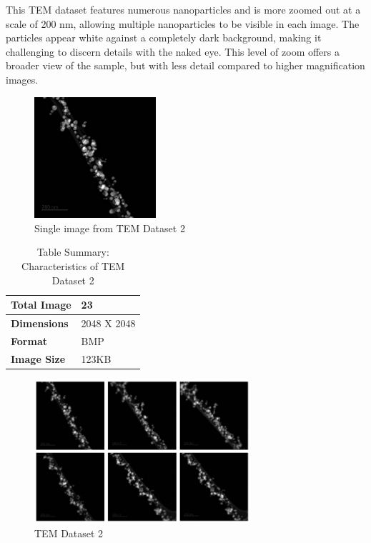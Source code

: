 \begin{itemize}
        This TEM dataset features numerous nanoparticles and is more zoomed out at a scale of 200 nm, allowing multiple nanoparticles to be visible in each image. The particles appear white against a completely dark background, making it challenging to discern details with the naked eye. This level of zoom offers a broader view of the sample, but with less detail compared to higher magnification images. 

        \begin{figure}[H]
            \centering
            \includegraphics[width=0.4\textwidth]{img/Results/Dataset_2/Single_D2.jpg}
            \caption{Single image from TEM Dataset 2}\label{fig:TEM Dataset 1}
        \end{figure}
        
        \begin{table}[H]
                  \centering
                  \caption{Table Summary: Characteristics of TEM Dataset 2}
                  \begin{tabularx}{.7\linewidth}{|X|X|}
                    \hline
                    \textbf{Total Image} & 23 \\
                    \hline
                    \textbf{Dimensions} & 2048 X 2048\\
                    \hline
                    \textbf{Format} & BMP \\
                    \hline
                    \textbf{Image Size} & 123KB \\
                    \hline
                  \end{tabularx}
              \end{table}
            
        \begin{figure}[H]
        \centering
        \includegraphics[width=0.71\textwidth]{img/TEM Dataset 2.png}
        \caption{TEM Dataset 2}\label{fig:TEM Dataset 2}
        \end{figure}


\end{itemize}
